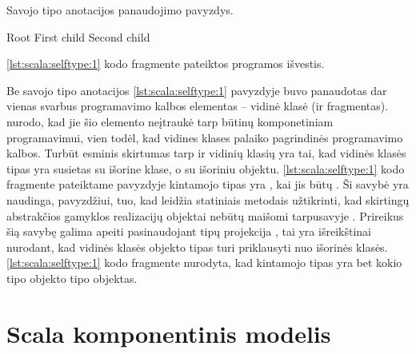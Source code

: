 \begin{listing}[H]
  \caption{Savojo tipo anotacijos panaudojimo pavyzdys.}
  \label{lst:scala:selftype:1}
\end{listing}

\begin{listing}[H]
  \begin{textcode}
    Root
    First child
    Second child
  \end{textcode}
  \caption{\ref{lst:scala:selftype:1} kodo fragmente pateiktos programos
  išvestis.}
  \label{lst:scala:selftype:2}
\end{listing}

Be savojo tipo anotacijos \ref{lst:scala:selftype:1} pavyzdyje buvo
panaudotas dar vienas svarbus programavimo kalbos elementas – vidinė
klasė (ir fragmentas). \cite[12]{scalable-component-abstractions}
nurodo, kad jie šio elemento neįtraukė tarp būtinų komponetiniam
programavimui, vien todėl, kad vidines klases palaiko pagrindinės
 programavimo kalbos. Turbūt esminis skirtumas tarp
 ir  vidinių klasių yra tai, kad
 vidinės klasės tipas yra susietas su išorine klase,
o  su išoriniu objektu. \ref{lst:scala:selftype:1}
kodo fragmente pateiktame pavyzdyje kintamojo  tipas
yra , kai  jis būtų
. Ši savybė yra naudinga, pavyzdžiui, tuo, kad 
leidžia statiniais metodais užtikrinti, kad skirtingų abstrakčios
gamyklos  realizacijų objektai nebūtų maišomi
tarpusavyje \cite[36]{scala-design-patterns}. Prireikus šią savybę
galima apeiti pasinaudojant tipų projekcija ,
tai yra išreikštinai nurodant, kad vidinės klasės objekto tipas
turi priklausyti nuo išorinės klasės. \ref{lst:scala:selftype:1}
kodo fragmente nurodyta, kad kintamojo  tipas yra
bet kokio  tipo objekto  tipo objektas.

\section{Scala komponentinis modelis}

